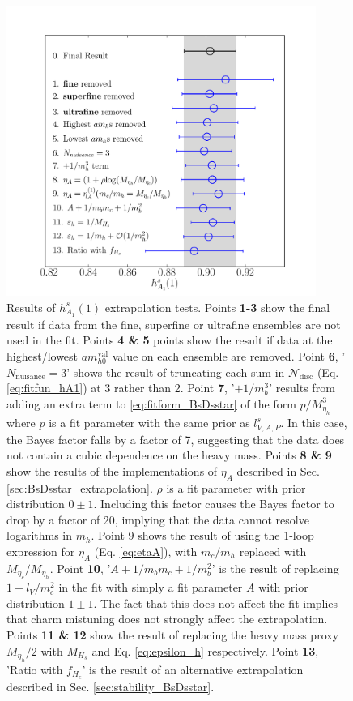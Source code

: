 \begin{figure}%
  \begin{center}
  \hspace{-18pt}
  \includegraphics[width=0.9\textwidth]{images/BsDsstar/hA1vsmh_fittests.pdf}
    \caption{Results of $h_{A_1}^s(1)$ extrapolation tests.
Points {\bf{1-3}} show the final result if data from the fine, superfine or ultrafine ensembles are not used in the fit.
    Points {\bf{4 \& 5}} points show the result if data at the highest/lowest $am_{h0}^{\text{val}}$ value on each ensemble are removed.
    Point {\bf{6}}, '$N_{\text{nuisance}}=3$' shows the result of truncating each sum in $\mathcal{N}_{\text{disc}}$ (Eq. \eqref{eq:fitfun_hA1}) at 3 rather than 2.
    Point {\bf{7}}, '$+1/m_b^3$' results from adding an extra term to \eqref{eq:fitform_BsDsstar} of the form $p/M_{\eta_h}^3$ where $p$ is a fit parameter with the same prior as $l_{V,A,P}^s$. In this case, the Bayes factor falls by a factor of 7, suggesting that the data does not contain a cubic dependence on the heavy mass.
    Points {\bf{8 \& 9}} show the results of the implementations of $\eta_A$ described in Sec. \ref{sec:BsDsstar_extrapolation}. $\rho$ is a fit parameter with prior distribution $0\pm 1$. Including this factor causes the Bayes factor to drop by a factor of 20, implying that the data cannot resolve logarithms in $m_h$. Point 9 shows the result of using the 1-loop expression for $\eta_A$ (Eq. \eqref{eq:etaA}), with $m_c/m_h$ replaced with $M_{\eta_c}/M_{\eta_h}$.
    Point {\bf{10}}, '$A+1/m_bm_c+1/m_b^2$' is the result of replacing $1+l_V/m_c^2$ in the fit with simply a fit parameter $A$ with prior distribution $1\pm 1$. The fact that this does not affect the fit implies that charm mistuning does not strongly affect the extrapolation.
    Points {\bf{11 \& 12}} show the result of replacing the heavy mass proxy $M_{\eta_h}/2$ with $M_{H_s}$ and Eq. \eqref{eq:epsilon_h} respectively.
    Point {\bf{13}}, 'Ratio with $f_{H_c}$' is the result of an alternative extrapolation described in Sec. \ref{sec:stability_BsDsstar}.  \label{fig:fittests_hA1}}
    \end{center}
\end{figure}


